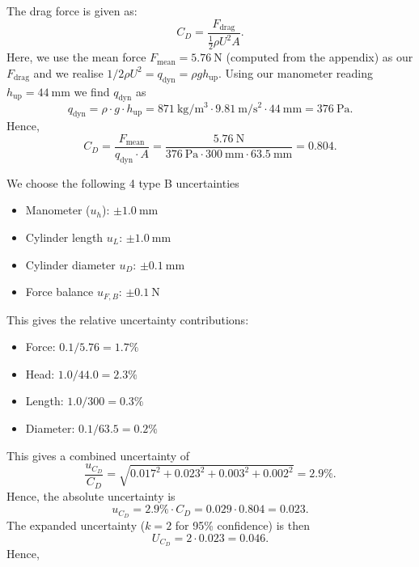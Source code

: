   \begin{derivation}
    The drag force is given as:
    \begin{equation*}
      C_D = \frac{F_{\text{drag}}}{\frac{1}{2} \rho U^2 A}
    .\end{equation*}
    Here, we use the mean force $F_{\text{mean}} = \qty{5,76}{\N} $ (computed from the appendix) as our $F_{\text{drag}}$ and we realise $1 / 2 \rho U^2 = q_{\text{dyn}} = \rho g h_{\mathrm{up}}$. Using our manometer reading $h_{\text{up}} = \qty{44}{\mm}$ we find $q_{\text{dyn}}$ as
    \begin{equation*}
      q_{\text{dyn}} = \rho \cdot g \cdot h_{\text{up}} = \qty{871}{\kg\per\m^3}  \cdot \qty{9,81}{\m\per\s^2} \cdot \qty{44}{\mm} = \qty{376}{\Pa} 
    .\end{equation*}
    Hence,
    \begin{equation*}
      C_D = \frac{F_{\text{mean}}}{q_{\text{dyn}} \cdot A} = \frac{\qty{5,76}{\N}}{\qty{376}{\Pa} \cdot \qty{300}{\mm} \cdot \qty{63,5}{\mm} } = \num{0,804} 
    .\end{equation*}
    
    We choose the following 4 type B uncertainties
    \begin{itemize}
      \item Manometer ($u_h$): $\pm \qty{1,0}{\mm} $
      \item Cylinder length $u_L$: $\pm \qty{1,0}{\mm}$
      \item Cylinder diameter $u_D$: $\pm \qty{0,1}{\mm}$
      \item Force balance $u_{F, B}$: $\pm \qty{0,1}{\N} $
    \end{itemize}
    This gives the relative uncertainty contributions:
    \begin{itemize}
      \item Force: $\num{0,1} / \num{5,76} = \num{1,7} \%$
      \item Head: $\num{1,0} / \num{44,0} = \num{2,3} \%$
      \item Length: $\num{1,0} / \num{300} = \num{0,3} \%$
      \item Diameter: $\num{0,1} / \num{63,5} = \num{0,2} \%$
    \end{itemize}
    This gives a combined uncertainty of
    \begin{equation*}
      \frac{u_{C_D}}{C_D} = \sqrt{\num{0,017}^2 + \num{0,023}^2 + \num{0,003}^2 + \num{0,002}^2} = \num{2,9} \%
    .\end{equation*}
    Hence, the absolute uncertainty is
    \begin{equation*}
      u_{C_D} = \num{2,9} \% \cdot C_D = \num{0,029} \cdot \num{0,804} = \num{0,023}  
    .\end{equation*}
    The expanded uncertainty ($k = 2$ for 95\% confidence) is then
    \begin{equation*}
      U_{C_D} = 2 \cdot \num{0,023}  = \num{0,046} 
    .\end{equation*}
    Hence,
  \end{derivation}

